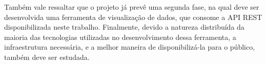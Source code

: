 Também vale ressaltar que o projeto já prevê uma segunda fase, na qual deve ser desenvolvida 
uma ferramenta de visualização de dados, que consome a API REST disponibilizada neste trabalho. 
Finalmente, devido a natureza distribuída da maioria das tecnologias utilizadas no 
desenvolvimento dessa ferramenta, a infraestrutura necessária, e a melhor maneira de 
disponibilizá-la para o público, também deve ser estudada.


